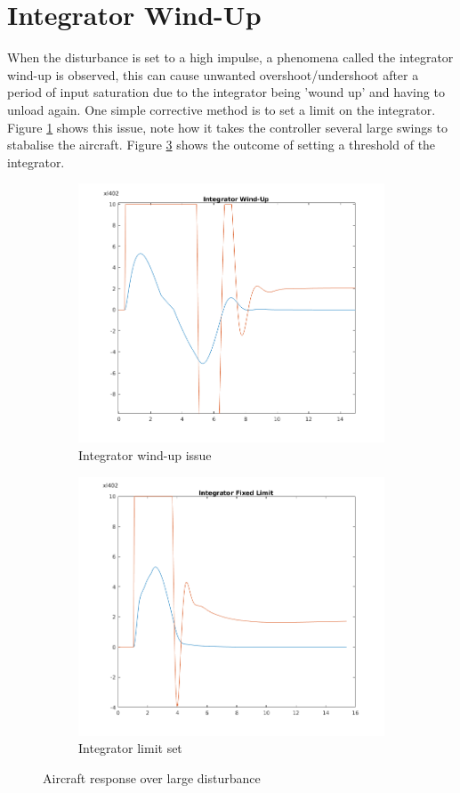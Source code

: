 \documentclass{article}
\begin{document}
\section{Integrator Wind-Up}
When the disturbance is set to a high impulse, a phenomena called the integrator wind-up is observed, this can cause unwanted overshoot/undershoot after a period of input saturation due to the integrator being 'wound up' and having to unload again. One simple corrective method is to set a limit on the integrator. Figure \ref{fig:wind} shows this issue, note how it takes the controller several large swings to stabalise the aircraft. Figure \ref{fig:wind_fixed} shows the outcome of setting a threshold of the integrator.

\begin{figure}[htp]
\centering
\begin{subfigure}{.5\textwidth}
  \centering
  \includegraphics[width=0.9\linewidth]{wind_up.png}
	\caption{Integrator wind-up issue}
	\label{fig:wind}
\end{subfigure}%
\begin{subfigure}{.5\textwidth}
  \centering
  \includegraphics[width=0.9\linewidth]{wind_up_fixed.png}
  \caption{Integrator limit set}
  \label{fig:wind_fixed}
\end{subfigure}
\caption{Aircraft response over large disturbance}
\end{figure}
\end{document}
